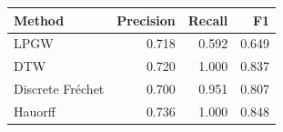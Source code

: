 \begin{tabular}{lrrr}
\toprule
Method & Precision & Recall & F1 \\
\midrule
LPGW & 0.718 & 0.592 & 0.649 \\
DTW & 0.720 & 1.000 & 0.837 \\
Discrete Fréchet & 0.700 & 0.951 & 0.807 \\
Hauorff & 0.736 & 1.000 & 0.848 \\
\bottomrule
\end{tabular}
